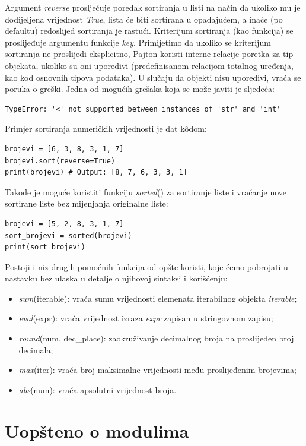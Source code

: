 Argument \textit{reverse} prosljećuje poredak sortiranja u listi na način da ukoliko mu je dodijeljena vrijednost \emph{True}, lista će biti sortirana u opadajućem, a inače (po defaultu) redoslijed sortiranja je rastući. Kriterijum sortiranja (kao funkcija) se proslijeđuje argumentu funkcije \textit{key}. Primijetimo da ukoliko se kriterijum sortiranja ne proslijedi eksplicitno, Pajton koristi interne relacije poretka za tip objekata, ukoliko su oni uporedivi (predefinisanom relacijom totalnog uređenja, kao kod osnovnih tipova podataka). U slučaju da objekti nisu uporedivi, vraća se poruka o greški.  Jedna od mogućih grešaka koja se može javiti je sljedeća:
\begin{verbatim}
TypeError: '<' not supported between instances of 'str' and 'int'
\end{verbatim}


Primjer sortiranja numeričkih vrijednosti je dat k\^odom:
\begin{verbatim}
brojevi = [6, 3, 8, 3, 1, 7]
brojevi.sort(reverse=True)
print(brojevi) # Output: [8, 7, 6, 3, 3, 1]
\end{verbatim}
  Takođe je moguće koristiti funkciju \textit{sorted}() za sortiranje liste i vraćanje nove sortirane liste bez mijenjanja originalne liste:
\begin{verbatim}
brojevi = [5, 2, 8, 3, 1, 7]
sort_brojevi = sorted(brojevi)
print(sort_brojevi)
\end{verbatim}

Postoji i niz drugih pomoćnih funkcija od opšte koristi, koje ćemo pobrojati u nastavku bez ulaska u detalje o njihovoj sintaksi i korišćenju:
\begin{itemize}
	\item \textit{sum}(iterable): vraća sumu vrijednosti elemenata iterabilnog objekta \emph{iterable};
	\item \textit{eval}(expr): vraća vrijednost izraza \emph{expr} zapisan u stringovnom zapisu;
	\item \textit{round}(num, dec\_place): zaokruživanje decimalnog broja na proslijeđen broj decimala;
	\item \textit{max}(iter): vraća broj maksimalne vrijednosti među proslijeđenim brojevima;
	\item \textit{abs}(num): vraća apsolutni vrijednost broja. 
\end{itemize}
\section{Uopšteno o modulima}

